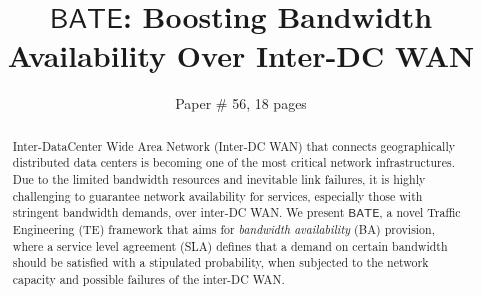 \documentclass[sigconf]{acmart}
\begin{document}
\title{\bf $\mathsf{BATE}$: Boosting Bandwidth Availability Over Inter-DC WAN}


\author{Paper \# 56, 18 pages}


\begin{abstract}
Inter-DataCenter Wide Area Network (Inter-DC WAN) that connects geographically distributed data centers is becoming one of the most critical network infrastructures.
Due to the limited bandwidth resources and inevitable link failures, it is highly challenging to guarantee network availability for services, especially those with stringent bandwidth demands, over inter-DC WAN.
We present $\mathsf{BATE}$,
a novel Traffic Engineering (TE)  framework that 
aims for \textit{bandwidth availability} (BA) provision, where a service level agreement (SLA) defines that a demand on certain bandwidth should be satisfied with a stipulated probability,  when subjected to the network capacity and possible failures of the inter-DC WAN.

\end{abstract}
\end{document}
